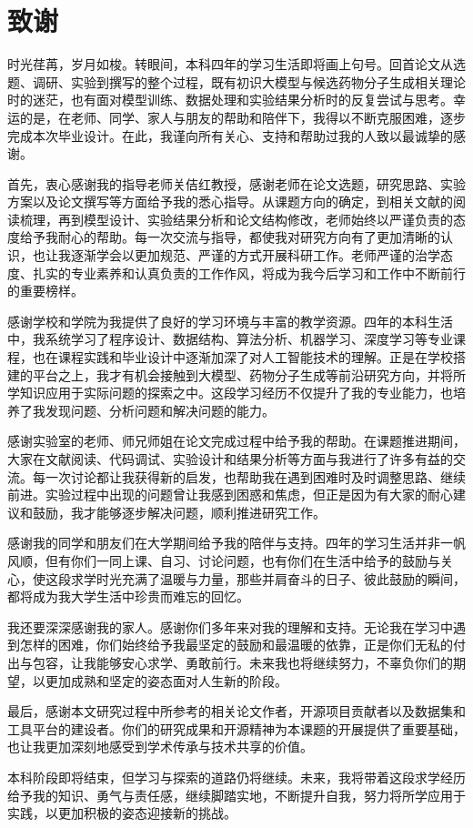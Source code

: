 \chapter*{致谢}

时光荏苒，岁月如梭。转眼间，本科四年的学习生活即将画上句号。回首论文从选题、调研、实验到撰写的整个过程，既有初识大模型与候选药物分子生成相关理论时的迷茫，也有面对模型训练、数据处理和实验结果分析时的反复尝试与思考。幸运的是，在老师、同学、家人与朋友的帮助和陪伴下，我得以不断克服困难，逐步完成本次毕业设计。在此，我谨向所有关心、支持和帮助过我的人致以最诚挚的感谢。

首先，衷心感谢我的指导老师关佶红教授，感谢老师在论文选题，研究思路、实验方案以及论文撰写等方面给予我的悉心指导。从课题方向的确定，到相关文献的阅读梳理，再到模型设计、实验结果分析和论文结构修改，老师始终以严谨负责的态度给予我耐心的帮助。每一次交流与指导，都使我对研究方向有了更加清晰的认识，也让我逐渐学会以更加规范、严谨的方式开展科研工作。老师严谨的治学态度、扎实的专业素养和认真负责的工作作风，将成为我今后学习和工作中不断前行的重要榜样。

感谢学校和学院为我提供了良好的学习环境与丰富的教学资源。四年的本科生活中，我系统学习了程序设计、数据结构、算法分析、机器学习、深度学习等专业课程，也在课程实践和毕业设计中逐渐加深了对人工智能技术的理解。正是在学校搭建的平台之上，我才有机会接触到大模型、药物分子生成等前沿研究方向，并将所学知识应用于实际问题的探索之中。这段学习经历不仅提升了我的专业能力，也培养了我发现问题、分析问题和解决问题的能力。

感谢实验室的老师、师兄师姐在论文完成过程中给予我的帮助。在课题推进期间，大家在文献阅读、代码调试、实验设计和结果分析等方面与我进行了许多有益的交流。每一次讨论都让我获得新的启发，也帮助我在遇到困难时及时调整思路、继续前进。实验过程中出现的问题曾让我感到困惑和焦虑，但正是因为有大家的耐心建议和鼓励，我才能够逐步解决问题，顺利推进研究工作。

感谢我的同学和朋友们在大学期间给予我的陪伴与支持。四年的学习生活并非一帆风顺，但有你们一同上课、自习、讨论问题，也有你们在生活中给予的鼓励与关心，使这段求学时光充满了温暖与力量，那些并肩奋斗的日子、彼此鼓励的瞬间，都将成为我大学生活中珍贵而难忘的回忆。

我还要深深感谢我的家人。感谢你们多年来对我的理解和支持。无论我在学习中遇到怎样的困难，你们始终给予我最坚定的鼓励和最温暖的依靠，正是你们无私的付出与包容，让我能够安心求学、勇敢前行。未来我也将继续努力，不辜负你们的期望，以更加成熟和坚定的姿态面对人生新的阶段。

最后，感谢本文研究过程中所参考的相关论文作者，开源项目贡献者以及数据集和工具平台的建设者。你们的研究成果和开源精神为本课题的开展提供了重要基础，也让我更加深刻地感受到学术传承与技术共享的价值。

本科阶段即将结束，但学习与探索的道路仍将继续。未来，我将带着这段求学经历给予我的知识、勇气与责任感，继续脚踏实地，不断提升自我，努力将所学应用于实践，以更加积极的姿态迎接新的挑战。
